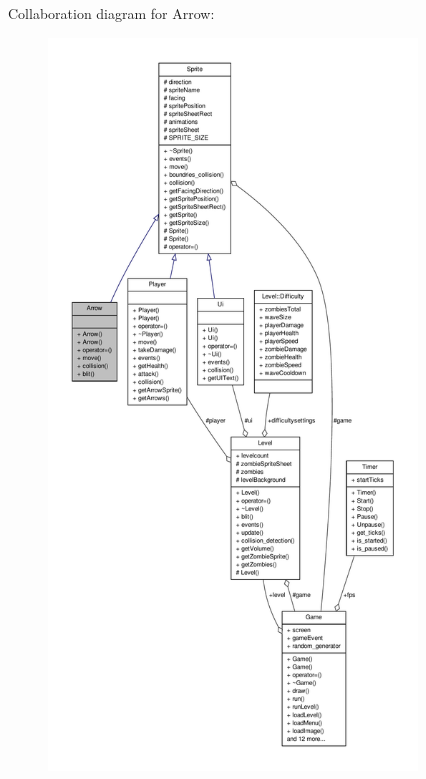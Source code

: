 Collaboration diagram for Arrow\-:
\nopagebreak
\begin{figure}[H]
\begin{center}
\leavevmode
\includegraphics[height=550pt]{classArrow__coll__graph}
\end{center}
\end{figure}
